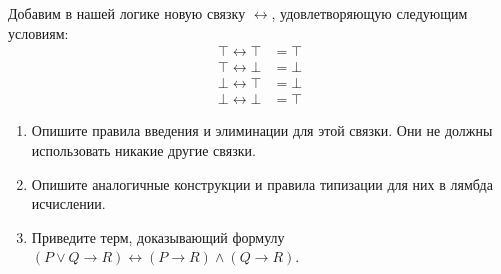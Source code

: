 \begin{task}[4]
Добавим в нашей логике новую связку $\leftrightarrow$, удовлетворяющую следующим условиям:
	\begin{align*}
		\top \leftrightarrow \top & = \top \\
		\top \leftrightarrow \bot & = \bot \\
		\bot \leftrightarrow \top & = \bot \\
		\bot \leftrightarrow \bot & = \top
	\end{align*}
	\begin{enumerate}
		\item Опишите правила введения и элиминации для этой связки.
		    Они не должны использовать никакие другие связки.
		\item Опишите аналогичные конструкции и правила типизации для них в лямбда исчислении.
		\item Приведите терм, доказывающий формулу $(P \lor Q \to R) \leftrightarrow (P \to R) \land (Q \to R)$.
	\end{enumerate}
\end{task}
